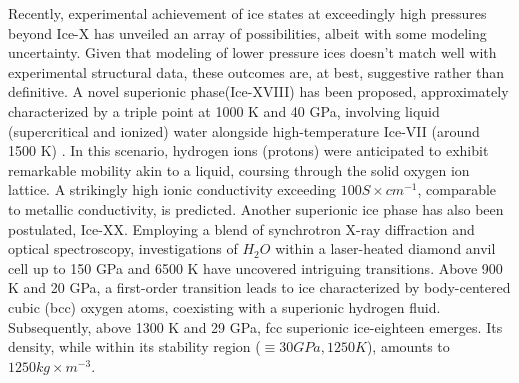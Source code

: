 Recently, experimental achievement of ice states at exceedingly high pressures beyond Ice-X has unveiled an array of possibilities, albeit with some modeling uncertainty. Given that modeling of lower pressure ices doesn't match well with experimental structural data, these outcomes are, at best, suggestive rather than definitive. A novel superionic phase(Ice-XVIII) has been proposed, approximately characterized by a triple point at 1000 K and 40 GPa, involving liquid (supercritical and ionized) water alongside high-temperature Ice-VII (around 1500 K) \cite{Goncharov_2009}. In this scenario, hydrogen ions (protons) were anticipated to exhibit remarkable mobility akin to a liquid, coursing through the solid oxygen ion lattice. A strikingly high ionic conductivity exceeding $100 S \times cm^{-1}$, comparable to metallic conductivity, is predicted.
Another superionic ice phase has also been postulated, Ice-XX. Employing a blend of synchrotron X-ray diffraction and optical spectroscopy, investigations of $H_2O$ within a laser-heated diamond anvil cell up to 150 GPa and 6500 K have uncovered intriguing transitions. Above 900 K and 20 GPa, a first-order transition leads to ice characterized by body-centered cubic (bcc) oxygen atoms, coexisting with a superionic hydrogen fluid. Subsequently, above 1300 K and 29 GPa, fcc superionic ice-eighteen emerges. Its density, while within its stability region ($\equiv 30 GPa, 1250 K$), amounts to $1250 kg \times m^{-3}$.

